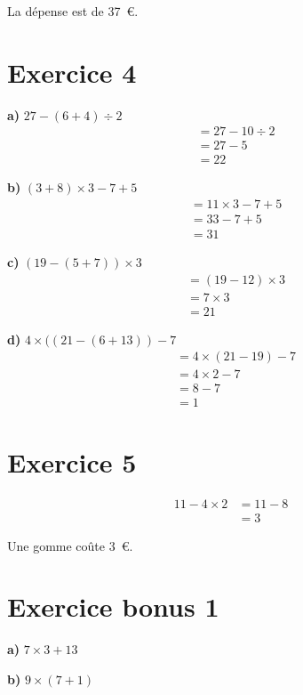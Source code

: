\documentclass[12pt]{extarticle}
\begin{document}
La dépense est de 37~€.

\section*{Exercice 4}

\textbf{a)} $27 - (6 + 4) \div 2$
\begin{align*}
&= 27 - 10 \div 2 \\
&= 27 - 5 \\
&= 22
\end{align*}

\textbf{b)} $(3 + 8) \times 3 - 7 + 5$
\begin{align*}
&= 11 \times 3 - 7 + 5 \\
&= 33 - 7 + 5 \\
&= 31
\end{align*}

\textbf{c)} $(19 - (5 + 7)) \times 3$
\begin{align*}
&= (19 - 12) \times 3 \\
&= 7 \times 3 \\
&= 21
\end{align*}

\textbf{d)} $4 \times ((21 - (6 + 13)) - 7$
\begin{align*}
&= 4 \times (21 - 19) - 7 \\
&= 4 \times 2 - 7 \\
&= 8 - 7 \\
&= 1
\end{align*}

\section*{Exercice 5}
\begin{align*}
11 - 4 \times 2 &= 11 - 8 \\
                &= 3
\end{align*}

Une gomme coûte 3~€.

\section*{Exercice bonus 1}

\textbf{a)} $7 \times 3 + 13$

\textbf{b)} $9 \times (7 + 1)$
\end{document}

